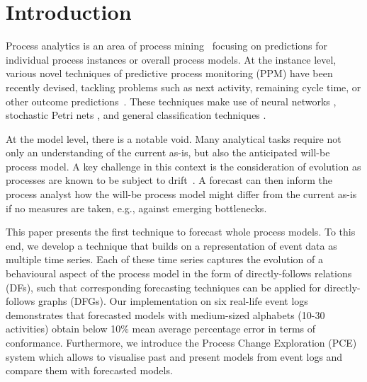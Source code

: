 \section{Introduction}\label{sec:introduction}
Process analytics is an area of process mining~\cite{van2016data} focusing on predictions for individual process instances or overall process models. At the instance level, 
various novel techniques of predictive process monitoring (PPM)  have been recently devised, tackling problems such as next activity, remaining cycle time, or other outcome predictions~\cite{DBLP:conf/bpm/Francescomarino18}. These techniques make use of neural networks \cite{DBLP:conf/caise/TaxVRD17}, stochastic Petri nets \cite{DBLP:conf/icsoc/Rogge-SoltiW13}, and general classification techniques \cite{DBLP:journals/tkdd/TeinemaaDRM19}.

At the model level, there is a notable void. Many analytical tasks require not only an understanding of the current as-is, but also the anticipated will-be process model. A key challenge in this context is the consideration of evolution as processes are known to be subject to drift~\cite{maaradji2017detecting,DBLP:conf/bpm/PollPRRR18,yeshchenko2019comprehensive,yeshchenko2021visual}. A forecast can then inform the process analyst how the will-be process model might differ from the current as-is if no measures are taken, e.g., against emerging bottlenecks.

This paper presents the first technique to forecast whole process models. To this end, we develop a technique that builds on a representation of event data as multiple time series. Each of these time series captures the evolution of a behavioural aspect of the process model in the form of directly-follows relations (DFs), such that corresponding forecasting techniques can be applied for directly-follows graphs (DFGs). Our implementation on six real-life event logs demonstrates that forecasted models with medium-sized alphabets (10-30 activities) obtain below 10\% mean average percentage error in terms of conformance.
Furthermore, we introduce the Process Change Exploration (PCE) system which allows to visualise past and present models from event logs and compare them with forecasted models.



